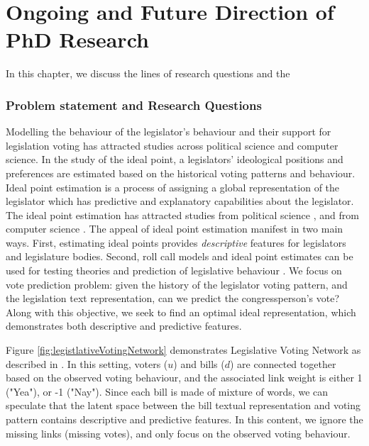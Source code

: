 \chapter{Ongoing and Future Direction of PhD Research}

\label{ch:proposal}
In this chapter, we discuss the lines of research questions and the 

\subsection{Problem statement and Research Questions}

Modelling the behaviour of the legislator's behaviour and their support for legislation voting has attracted studies across political science and computer science. In the study of the ideal point, a legislators' ideological positions and preferences are estimated based on the historical voting patterns and behaviour. Ideal point estimation is a process of assigning a global representation of the legislator which has predictive and explanatory capabilities about the legislator. The ideal point estimation has attracted studies from political science \citep{Clinton2004, Clinton2012, feldman2013, heckman1997}, and from computer science \citep{Kraft, Kornilova,song, Gerrish2011}. The appeal of ideal point estimation manifest in two main ways. First, estimating ideal points provides \textit{descriptive} features for legislators and legislature bodies. Second, roll call models and ideal point estimates can be used for testing theories and prediction of legislative behaviour \cite{Clinton2004}. We focus on vote prediction problem: given the history of the legislator voting pattern, and the legislation text representation, can we predict the congressperson's vote? Along with this objective, we seek to find an optimal ideal representation, which demonstrates both descriptive and predictive features.

Figure \ref{fig:legistlativeVotingNetwork} demonstrates Legislative Voting Network as described in \cite{Gua}. In this setting, voters ($u$) and bills ($d$) are connected together based on the observed voting behaviour, and the associated link weight is either 1 ("Yea"), or -1 ("Nay"). Since each bill is made of mixture of words, we can speculate that the latent space between the bill textual representation and voting pattern contains descriptive and predictive features. In this content, we ignore the missing links (missing votes), and only focus on the observed voting behaviour. 

